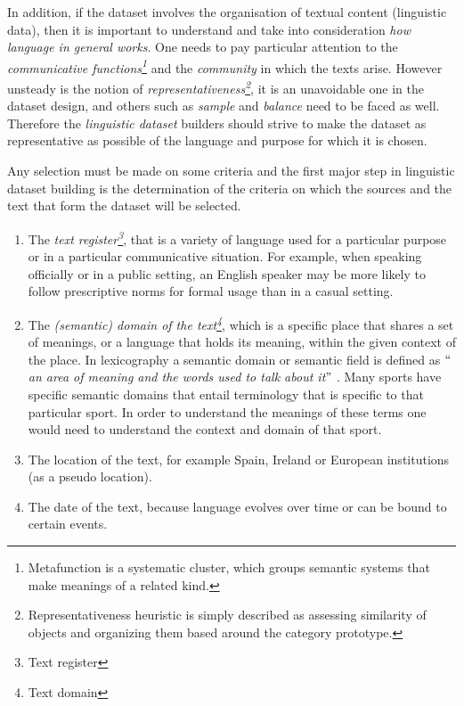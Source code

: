 In addition, if the dataset involves the organisation of textual content (linguistic data), then it is important to understand and take into consideration \textit{how language in general works}. One needs to pay particular attention to the \textit{communicative functions\footnote{ Metafunction is a systematic cluster, which groups semantic systems that make meanings of a related kind.  }} and the \textit{community} in which the texts arise. However unsteady is the notion of \textit{representativeness\footnote{ Representativeness heuristic is simply described as assessing similarity of objects and organizing them based around the category prototype.  }}, it is an unavoidable one in the dataset design, and others such as \textit{sample} and \textit{balance} need to be faced as well. Therefore the \textit{linguistic dataset} builders should strive to make the dataset as representative as possible of the language and purpose for which it is chosen. 

Any selection must be made on some criteria and the first major step in linguistic dataset building is the determination of the criteria on which the sources and the text that form the dataset will be selected.

\begin{enumerate}
	\item The \textit{text register\footnote{ Text register }}, that is a variety of language used for a particular purpose or in a particular communicative situation. For example, when speaking officially or in a public setting, an English speaker may be more likely to follow prescriptive norms for formal usage than in a casual setting. 
	\item The \textit{(semantic) domain of the text\footnote{ Text domain  }}, which is a specific place that shares a set of meanings, or a language that holds its meaning, within the given context of the place. In lexicography a semantic domain or semantic field is defined as \textit{$``$an area of meaning and the words used to talk about it$"$ }. Many sports have specific semantic domains that entail terminology that is specific to that particular sport. In order to understand the meanings of these terms one would need to understand the context and domain of that sport.
	\item The location of the text, for example Spain, Ireland or European institutions (as a pseudo location).
	\item The date of the text, because language evolves over time or can be bound to certain events. 
\end{enumerate}


